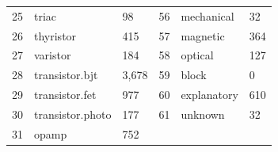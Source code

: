 \begin{table}[H]
\begin{tabular}{rll|rll}
        25 & triac & 98 & 56 & mechanical & 32 \\
        26 & thyristor & 415 & 57 & magnetic & 364 \\
        27 & varistor & 184 & 58 & optical & 127 \\
        28 & transistor.bjt & 3,678 & 59 & block & 0 \\
        29 & transistor.fet & 977 & 60 & explanatory & 610 \\
        30 & transistor.photo & 177 & 61 & unknown & 32 \\
        31 & opamp & 752 &  &  &  \\
        \bottomrule
    \end{tabular}
\end{table}

